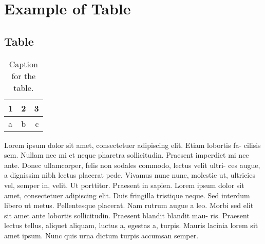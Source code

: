 \clearpage
\chapter{Example of Table}
\section{Table}

\begin{table}[h!]
  \begin{center}
    \caption{Caption for the table.}
    \label{tab:table1}
    \begin{tabular}{l|c||r}
      1 & 2 & 3\\
      \hline
      a & b & c\\
    \end{tabular}
  \end{center}
\end{table}

Lorem ipsum dolor sit amet, consectetuer adipiscing elit. Etiam lobortis fa- cilisis sem. Nullam nec mi et neque pharetra sollicitudin. Praesent imperdiet mi nec ante. Donec ullamcorper, felis non sodales commodo, lectus velit ultri- ces augue, a dignissim nibh lectus placerat pede. Vivamus nunc nunc, molestie ut, ultricies vel, semper in, velit. Ut porttitor. Praesent in sapien. Lorem ipsum dolor sit amet, consectetuer adipiscing elit. Duis fringilla tristique neque. Sed interdum libero ut metus. Pellentesque placerat. Nam rutrum augue a leo. Morbi sed elit sit amet ante lobortis sollicitudin. Praesent blandit blandit mau- ris. Praesent lectus tellus, aliquet aliquam, luctus a, egestas a, turpis. Mauris lacinia lorem sit amet ipsum. Nunc quis urna dictum turpis accumsan semper.


